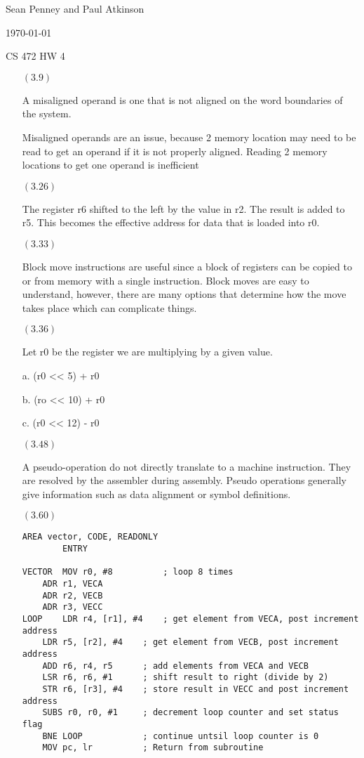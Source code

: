 \documentclass[letterpaper,10pt,titlepage]{article}
\def\name{Sean Penney and Paul Atkinson}
\begin{document}
\hfill \name

\hfill \today

\hfill CS 472 HW 4

\begin{enumerate}
\item[$(3.9)$] 

  A misaligned operand is one that is not aligned on the word boundaries of the system.
  
  Misaligned operands are an issue, because 2 memory location may need to be read to get an operand if it is not properly aligned.
  Reading 2 memory locations to get one operand is inefficient

\item[$(3.26)$] 

  The register r6 shifted to the left by the value in r2.  The result is added to r5.  This becomes the effective address for data that is loaded into r0.
  
\item[$(3.33)$] 

  Block move instructions are useful since a block of registers can be copied to or from memory with a single instruction.
  Block moves are easy to understand, however, there are many options that determine how the move takes place which can complicate things.

\item[$(3.36)$] 

  Let r0 be the register we are multiplying by a given value.
  
  a. (r0 << 5) + r0
  
  b. (ro << 10) + r0
  
  c. (r0 << 12) - r0 

\item[$(3.48)$]

  A pseudo-operation do not directly translate to a machine instruction.  They are resolved by the assembler during assembly.
  Pseudo operations generally give information such as data alignment or symbol definitions.
  
\item[$(3.60)$]

\begin{lstlisting}
AREA vector, CODE, READONLY
		ENTRY

VECTOR	MOV r0, #8			; loop 8 times
	ADR r1, VECA
	ADR r2, VECB
	ADR r3, VECC
LOOP	LDR r4, [r1], #4	; get element from VECA, post increment address
	LDR r5, [r2], #4	; get element from VECB, post increment address
	ADD r6, r4, r5		; add elements from VECA and VECB
	LSR r6, r6, #1		; shift result to right (divide by 2)
	STR r6, [r3], #4	; store result in VECC and post increment address
	SUBS r0, r0, #1		; decrement loop counter and set status flag
	BNE LOOP			; continue untsil loop counter is 0
	MOV pc, lr			; Return from subroutine
		

\end{lstlisting}
\end{enumerate}
\end{document}
